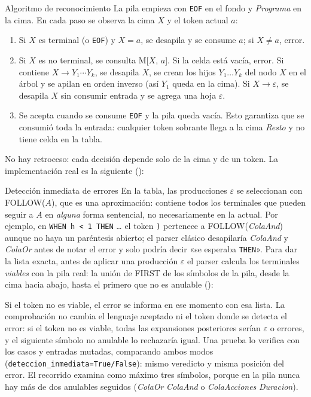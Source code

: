 \documentclass[11pt,letterpaper]{article}
\makeatletter
\renewcommand\subsection{\@startsection{subsection}{2}{\z@}{-2.6ex\@plus -1ex \@minus -.2ex}{1.0ex \@plus .2ex}%
  {\normalfont\large\bfseries}}
\newcommand{\ruta}[1]{\nolinkurl{#1}}
\newcommand{\T}[1]{\texttt{#1}}
\newcommand{\NT}[1]{\textit{#1}}
\newcommand{\eps}{\ensuremath{\varepsilon}}
\newcommand{\archivopeq}[1]{\begingroup\footnotesize\endgroup}
\makeatother
\begin{document}
\subsection{Algoritmo de reconocimiento}
La pila empieza con \T{EOF} en el fondo y \NT{Programa} en la cima. En cada paso se observa la cima $X$ y el
token actual $a$:
\begin{enumerate}
\item Si $X$ es terminal (o \T{EOF}) y $X = a$, se desapila y se consume $a$; si $X \neq a$, error.
\item Si $X$ es no terminal, se consulta M[$X$, $a$]. Si la celda está vacía, error. Si contiene
$X \to Y_1 \cdots Y_k$, se desapila $X$, se crean los hijos $Y_1 \ldots Y_k$ del nodo $X$ en el árbol y se apilan en
orden inverso (así $Y_1$ queda en la cima). Si $X \to \varepsilon$, se desapila $X$ sin consumir entrada y se
agrega una hoja \eps.
\item Se acepta cuando se consume \T{EOF} y la pila queda vacía. Esto garantiza que se consumió toda la entrada:
cualquier token sobrante llega a la cima \NT{Resto} y no tiene celda en la tabla.
\end{enumerate}
No hay retroceso: cada decisión depende solo de la cima y de un token. La implementación real es la
siguiente (\LineasExtractoParser):

\archivopeq{generado/extracto_parser.txt}

\subsection{Detección inmediata de errores}
En la tabla, las producciones \eps{} se seleccionan con FOLLOW($A$), que es una aproximación: contiene todos los
terminales que pueden seguir a $A$ en \emph{alguna} forma sentencial, no necesariamente en la actual. Por
ejemplo, en \T{WHEN h < 1 THEN} \ldots{} el token \T{)} pertenece a FOLLOW(\NT{ColaAnd}) aunque no haya un
paréntesis abierto; el parser clásico desapilaría \NT{ColaAnd} y \NT{ColaOr} antes de notar el error y solo
podría decir «se esperaba \T{THEN}». Para dar la lista exacta, antes de aplicar una producción \eps{} el parser
calcula los terminales \emph{viables} con la pila real: la unión de FIRST de los símbolos de la pila, desde la
cima hacia abajo, hasta el primero que no es anulable (\LineasExtractoViables):

\archivopeq{generado/extracto_viables.txt}

Si el token no es viable, el error se informa en ese momento con esa lista. La comprobación no cambia el
lenguaje aceptado ni el token donde se detecta el error: si el token no es viable, todas las expansiones
posteriores serían \eps{} o errores, y el siguiente símbolo no anulable lo rechazaría igual. Una prueba lo
verifica con los \NumCasos{} casos y \NumMutacionesInmediata{} entradas mutadas, comparando ambos modos
(\ruta{deteccion_inmediata=True/False}): mismo veredicto y misma posición del error. El recorrido examina como
máximo tres símbolos, porque en la pila nunca hay más de dos anulables seguidos (\NT{ColaOr} \NT{ColaAnd} o
\NT{ColaAcciones} \NT{Duracion}).
\end{document}
